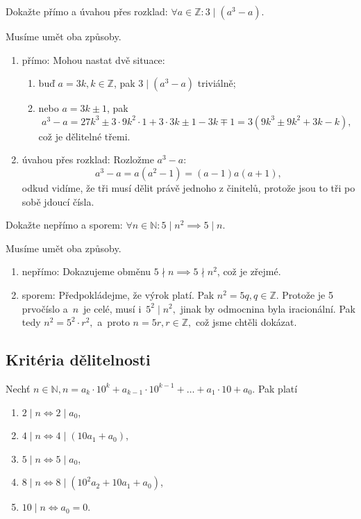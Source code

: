 \begin{priklad}
Dokažte přímo a úvahou přes rozklad: $\forall a \in \mathbb Z\colon 3\mid (a^3-a).$
\end{priklad}

\begin{reseni}
Musíme umět oba způsoby.
    \begin{enumerate}[$i.$]
    	\item přímo: Mohou nastat dvě situace:
        \begin{enumerate}[$a.$]
       	    \item buď $a=3k, k\in \mathbb Z $, pak $3\mid (a^3-a)$ triviálně;
            \item nebo $a=3k\pm 1$, pak $$a^3-a=27k^3\pm 3\cdot 9k^2\cdot 1 + 3\cdot 3k \pm 1-3k\mp 1=
            3(9k^3\pm 9k^2 + 3k-k),$$ což je dělitelné třemi.
        \end{enumerate}
        \item úvahou přes rozklad: Rozložme $a^3-a$:
        \[
            a^3-a = a(a^2-1)=(a-1)a(a+1),
        \]
        odkud vidíme, že tři musí dělit právě jednoho z činitelů, protože jsou to tři po sobě jdoucí čísla.
    \end{enumerate}
\end{reseni}

\begin{priklad}
Dokažte nepřímo a sporem: $\forall n \in \mathbb N\colon 5 \mid n^2 \implies 5 \mid n.$
\end{priklad}

\begin{reseni}
Musíme umět oba způsoby.
\begin{enumerate}[$i.$]
	\item nepřímo: Dokazujeme obměnu $5 \nmid n \implies 5 \nmid n^2$, což je zřejmé.
	\item sporem: Předpokládejme, že výrok platí. Pak $n^2=5q, q \in \mathbb Z$. Protože je 5 prvočíslo a~$n$~je
    celé, musí i~$5^2 \mid n^2,$ jinak by odmocnina byla iracionální. Pak tedy
    $n^2=5^2\cdot r^2,$ a~proto $n=5r, r \in \mathbb Z,$ což jsme chtěli dokázat.
\end{enumerate}
\end{reseni}

\subsection*{Kritéria dělitelnosti}
\begin{veta}
  Nechť $n\in \mathbb N, n=a_k\cdot 10^k+a_{k-1}\cdot 10^{k-1}+\dots + a_1\cdot 10 + a_0.$ Pak platí
  \begin{enumerate}[$i.$]
    \item $2 \mid n \iff 2 \mid a_0$,
    \item $4 \mid n \iff 4 \mid (10a_1 + a_0)$,
    \item $5 \mid n \iff 5 \mid a_0$,
    \item $8 \mid n \iff 8 \mid (10^2a_2 + 10a_1 + a_0)$,
    \item $10 \mid n \iff a_0 = 0$.
  \end{enumerate}
\end{veta}

